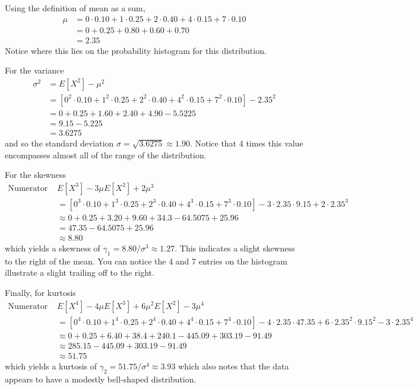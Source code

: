 \documentclass[10pt,]{book}
\theoremstyle{plain}
\theoremstyle{definition}
\theoremstyle{definition}
\theoremstyle{definition}
\numberwithin{equation}{section}
\begin{document}
\par

	Using the definition of mean as a sum,
	\begin{align*}
\mu & = 0 \cdot 0.10 + 1 \cdot 0.25 + 2 \cdot 0.40 + 4 \cdot 0.15 + 7 \cdot 0.10\\
 & = 0 + 0.25 + 0.80 + 0.60 + 0.70\\
 & = 2.35
\end{align*}
	Notice where this lies on the probability histogram for this distribution.
\par
For the variance
	\begin{align*}
\sigma^2 & = E[X^2] - \mu^2\\
 & = \left [ 0^2 \cdot 0.10 + 1^2 \cdot 0.25 + 2^2 \cdot 0.40 + 4^2 \cdot 0.15 + 7^2 \cdot 0.10 \right ] - 2.35^2\\
 & = 0 + 0.25 + 1.60 + 2.40 + 4.90 - 5.5225\\
 & = 9.15 - 5.225\\
 & = 3.6275 
\end{align*}	
	and so the standard deviation \(\sigma = \sqrt{3.6275} \approx 1.90\). Notice that 4 times this value encompasses almost all of the range of the distribution.
\par
For the skewness
	\begin{align*}
 \text{Numerator = } & E[X^3] - 3 \mu E[X^2] + 2\mu^3\\
 & = \left [ 0^3 \cdot 0.10 + 1^3 \cdot 0.25 + 2^3 \cdot 0.40 + 4^3 \cdot 0.15 + 7^3 \cdot 0.10 \right ] - 3 \cdot 2.35 \cdot 9.15 + 2 \cdot 2.35^3\\
 & \approx 0 + 0.25 + 3.20 + 9.60 + 34.3 - 64.5075 + 25.96\\
 & = 47.35 - 64.5075 + 25.96\\
 & \approx 8.80
\end{align*}
	which yields a skewness of \(\gamma_1 = 8.80 / \sigma^3 \approx 1.27 \). This indicates a slight skewness to the right of the mean. You can notice the 4 and 7 entries on the histogram illustrate a slight trailing off to the right.
\par
Finally, for kurtosis
	\begin{align*}
 \text{Numerator = } & E[X^4] - 4 \mu E[X^3] + 6 \mu^2 E[X^2] - 3\mu^4\\
 & = \left [ 0^4 \cdot 0.10 + 1^4 \cdot 0.25 + 2^4 \cdot 0.40 + 4^4 \cdot 0.15 + 7^4 \cdot 0.10 \right ] - 4 \cdot 2.35 \cdot 47.35 + 6 \cdot 2.35^2 \cdot 9.15^2 - 3 \cdot 2.35^4\\
 & \approx 0 + 0.25 + 6.40 + 38.4 + 240.1 - 445.09 + 303.19 - 91.49\\
 & \approx 285.15 - 445.09 + 303.19 - 91.49\\
 & \approx 51.75
\end{align*}
	which yields a kurtosis of \(\gamma_2 = 51.75 / \sigma^4 \approx 3.93\) which also notes that the data appears to have a modestly bell-shaped distribution.
\par
\end{document}
